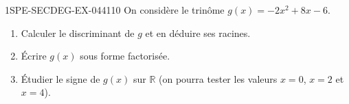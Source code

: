 \begin{exercice}{1SPE-SECDEG-EX-044}{1}{10}
On considère le trinôme $g(x) = -2x^2 + 8x - 6$.

\begin{enumerate}
  \item Calculer le discriminant de $g$ et en déduire ses racines.
  \item Écrire $g(x)$ sous forme factorisée.
  \item Étudier le signe de $g(x)$ sur $\mathbb{R}$ (on pourra tester les valeurs $x = 0$, $x = 2$ et $x = 4$).
\end{enumerate}
\end{exercice}
